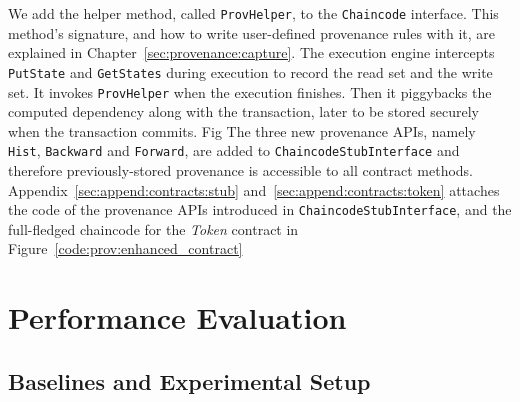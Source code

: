We add the helper method, called \texttt{ProvHelper}, to the \texttt{Chaincode} interface. This method's signature,
and how to write user-defined provenance rules with it, are explained in Chapter~\ref{sec:provenance:capture}. The
execution engine intercepts \texttt{PutState} and \texttt{GetStates} during execution to record the read set and the
write set. It invokes \texttt{ProvHelper} when the execution finishes. Then it piggybacks the computed dependency along with the transaction, later to be stored securely when the transaction commits. Fig
The three new provenance APIs, namely \texttt{Hist}, \texttt{Backward} and \texttt{Forward}, are added to \texttt{ChaincodeStubInterface}
and therefore previously-stored provenance is accessible to all contract methods. 
Appendix~\ref{sec:append:contracts:stub} and~\ref{sec:append:contracts:token} attaches the code of the provenance APIs introduced in \texttt{ChaincodeStubInterface}, and the full-fledged chaincode for the \textit{Token} contract in Figure~\ref{code:prov:enhanced_contract}

\section{Performance Evaluation}
\label{sec:provenance:exp}
\subsection{Baselines and Experimental Setup}
\label{sec:provenance:exp:setup}

